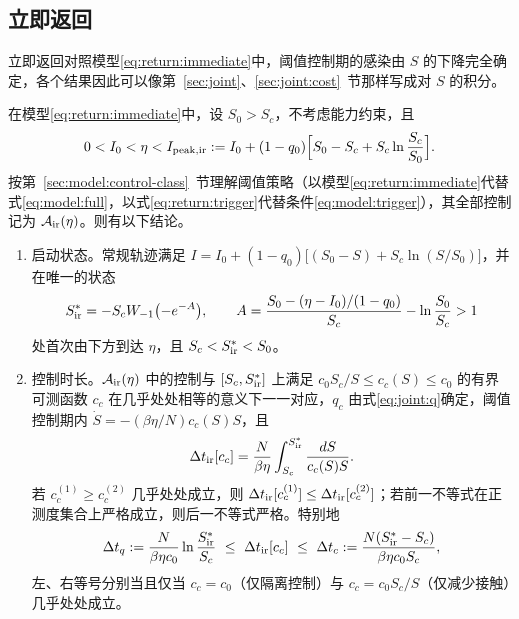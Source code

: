 \subsection{立即返回}
\label{sec:return:immediate}
立即返回对照模型\eqref{eq:return:immediate}中，阈值控制期的感染由 $S$ 的下降完全确定，各个结果因此可以像第~\ref{sec:joint}、\ref{sec:joint:cost}~节那样写成对 $S$ 的积分。
\begin{proposition}
\label{prop:return:immediate}
在模型\eqref{eq:return:immediate}中，设 $S_0>S_c$，不考虑能力约束，且
\begin{equation}
0<I_0<\eta<I_{\rm peak,ir}:=I_0+(1-q_0)\Bigl[S_0-S_c+S_c\ln\frac{S_c}{S_0}\Bigr].
\label{eq:return:trigger}
\end{equation}
按第~\ref{sec:model:control-class}~节理解阈值策略（以模型\eqref{eq:return:immediate}代替式\eqref{eq:model:full}，以式\eqref{eq:return:trigger}代替条件\eqref{eq:model:trigger}），其全部控制记为 $\mathcal A_{\rm ir}(\eta)$。则有以下结论。
\begin{enumerate}
\renewcommand{\labelenumi}{(\roman{enumi})}
\item 启动状态。常规轨迹满足 $I=I_0+(1-q_0)\bigl[(S_0-S)+S_c\ln(S/S_0)\bigr]$，并在唯一的状态
\begin{equation}
S^*_{\rm ir}=-S_cW_{-1}\bigl(-e^{-A}\bigr),\qquad
A=\frac{S_0-(\eta-I_0)/(1-q_0)}{S_c}-\ln\frac{S_0}{S_c}>1
\label{eq:return:Sstar}
\end{equation}
处首次由下方到达 $\eta$，且 $S_c<S^*_{\rm ir}<S_0$。
\item 控制时长。$\mathcal A_{\rm ir}(\eta)$ 中的控制与 $[S_c,S^*_{\rm ir}]$ 上满足 $c_0S_c/S\le c_c(S)\le c_0$ 的有界可测函数 $c_c$ 在几乎处处相等的意义下一一对应，$q_c$ 由式\eqref{eq:joint:q}确定，阈值控制期内 $\dot S=-(\beta\eta/N)c_c(S)S$，且
\begin{equation}
\Delta t_{\rm ir}[c_c]=\frac{N}{\beta\eta}\int_{S_c}^{S^*_{\rm ir}}\frac{dS}{c_c(S)S}.
\label{eq:return:duration}
\end{equation}
若 $c_c^{(1)}\ge c_c^{(2)}$ 几乎处处成立，则 $\Delta t_{\rm ir}[c_c^{(1)}]\le\Delta t_{\rm ir}[c_c^{(2)}]$；若前一不等式在正测度集合上严格成立，则后一不等式严格。特别地
\begin{equation}
\Delta t_q:=\frac{N}{\beta\eta c_0}\ln\frac{S^*_{\rm ir}}{S_c}\ \le\ \Delta t_{\rm ir}[c_c]\ \le\ \Delta t_c:=\frac{N(S^*_{\rm ir}-S_c)}{\beta\eta c_0S_c},
\label{eq:return:duration-bounds}
\end{equation}
左、右等号分别当且仅当 $c_c=c_0$（仅隔离控制）与 $c_c=c_0S_c/S$（仅减少接触）几乎处处成立。

\end{enumerate}
\end{proposition}
